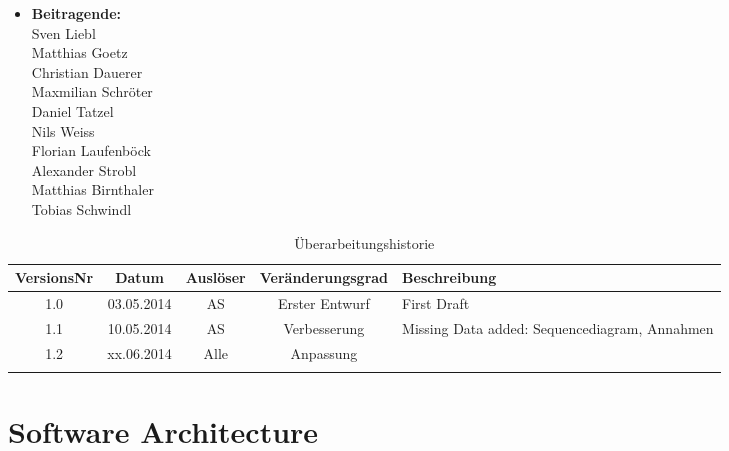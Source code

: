 \documentclass[10pt,a4paper]{scrartcl}
\begin{document}


\newpage
\begin{itemize}
\item[] \textbf{\large Beitragende:}\\
Sven Liebl\\
Matthias Goetz\\
Christian Dauerer\\
Maxmilian Schröter\\
Daniel Tatzel\\
Nils Weiss\\
Florian Laufenböck\\
Alexander Strobl\\
Matthias Birnthaler\\
Tobias Schwindl
\end{itemize}

\bigskip

\begin{table}[!h]
 	\centering
	\begin{tabular}{|c|c|c|c||p{5cm}|}
	\hline
	\textbf{VersionsNr} &  \textbf{Datum} & \textbf{Auslöser} & \textbf{Veränderungsgrad} & \textbf{Beschreibung} \\
	\hline
	1.0 & 03.05.2014 & AS & Erster Entwurf & First Draft \\
	\hline
	1.1 & 10.05.2014 & AS & Verbesserung & Missing Data added:  \newline Sequencediagram, Annahmen \\
	\hline
	1.2 & xx.06.2014 & Alle & Anpassung & \\
	\hline
	\text{ } & \text{ } & \text{ } & \text{ } & \text{ } \\
	\hline
	\end{tabular}

\caption{Überarbeitungshistorie}
\end{table}

\newpage
\tableofcontents

\newpage
\section{Software Architecture}
\end{document}
